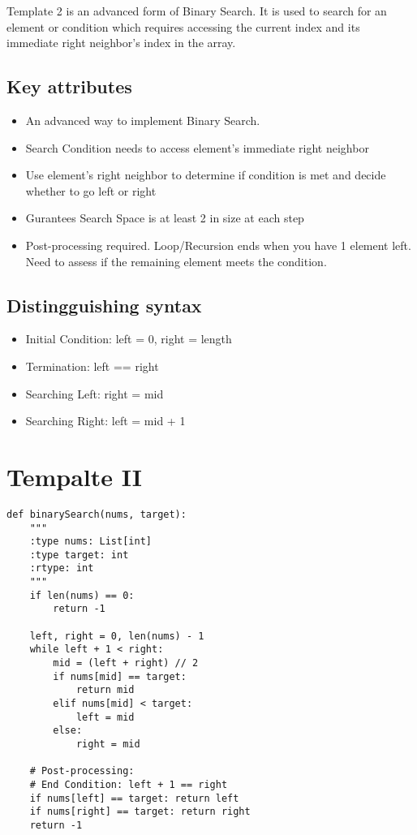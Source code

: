 Template 2 is an advanced form of Binary Search.
It is used to search for an element or condition which requires accessing the current index and its immediate right neighbor's index in the array.


\subsection{Key attributes}

\begin{itemize}
\item An advanced way to implement Binary Search.
\item Search Condition needs to access element's immediate right neighbor
\item Use element's right neighbor to determine if condition is met and decide whether to go left or right
\item Gurantees Search Space is at least 2 in size at each step
\item Post-processing required. Loop/Recursion ends when you have 1 element left. Need to assess if the remaining element meets the condition.
\end{itemize}



\subsection{Distingguishing syntax}

\begin{itemize}
\item Initial Condition: left = 0, right = length
\item Termination: left == right
\item Searching Left: right = mid
\item Searching Right: left = mid + 1
\end{itemize}


\section{Tempalte II}

\begin{lstlisting}
def binarySearch(nums, target):
    """
    :type nums: List[int]
    :type target: int
    :rtype: int
    """
    if len(nums) == 0:
        return -1

    left, right = 0, len(nums) - 1
    while left + 1 < right:
        mid = (left + right) // 2
        if nums[mid] == target:
            return mid
        elif nums[mid] < target:
            left = mid
        else:
            right = mid

    # Post-processing:
    # End Condition: left + 1 == right
    if nums[left] == target: return left
    if nums[right] == target: return right
    return -1  
\end{lstlisting}



